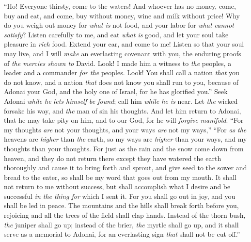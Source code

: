 \begin{biblechapter} %
 “Ho! Everyone thirsty, come to the waters! 
And whoever has no money, come, buy and eat, 
and come, buy without money, 
wine and milk without price!
\verse Why do you weigh out money for \textit{what is} not food, 
and your labor for \textit{what cannot satisfy}? 
Listen carefully to me, and eat \textit{what is} good, 
and let your soul take pleasure in \textit{rich} food.
\verse Extend your ear, and come to me! 
Listen so that your soul may live, 
and I will \textit{make} an everlasting covenant with you, 
the enduring proofs of \textit{the mercies shown to} David.
\verse Look! I made him a witness to \textit{the} peoples, 
a leader and a commander \textit{for the} peoples.
\verse Look! You shall call a nation \textit{that} you do not know, 
and a nation \textit{that} does not know you shall run to you, 
because of Adonai your God, 
and the holy one of Israel, for he has glorified you.”
\verse Seek Adonai \textit{while he lets himself be found}; 
call him \textit{while he is} near.
\verse Let \textit{the} wicked forsake his way, 
and \textit{the} man of sin his thoughts. 
And let him return to Adonai, that he may take pity on him, 
and to our God, for he will \textit{forgive manifold}.
\verse “For my thoughts \textit{are} not your thoughts, 
and your ways \textit{are} not my ways,”
\verse “For \textit{as} \textit{the} heavens are \textit{higher} than \textit{the} earth, 
so my ways are \textit{higher} than your ways, 
and my thoughts than your thoughts.
\verse For just as the rain and the snow come down from heaven, 
and they do not return there 
except they have watered the earth thoroughly 
and cause it to bring forth and sprout, 
and give seed to the sower 
and bread to the eater,
\verse so shall be my word that goes out from my mouth. 
It shall not return to me without success, 
but shall accomplish what I desire 
and be successful \textit{in the thing for} which I sent it.
\verse For you shall go out in joy, 
and you shall be led in peace. 
The mountains and the hills shall break forth before you, rejoicing 
and all the trees of the field shall clap hands.
\verse Instead of the thorn bush, \textit{the} juniper shall go up; 
instead of the brier, \textit{the} myrtle shall go up, 
and it shall serve as a memorial to Adonai, 
for an everlasting sign \textit{that} shall not be cut off.”
\end{biblechapter}

